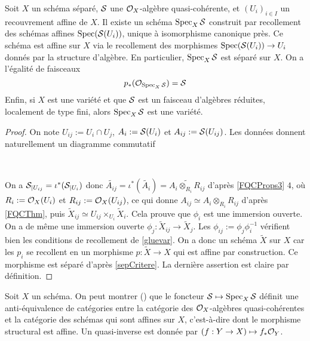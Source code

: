 \begin{cons}	\label{relspec}
Soit $X$ un schéma séparé, $\mathcal{S}$ une $\mathcal{O}_X$-algèbre quasi-cohérente, et $(U_i)_{i\in I}$ un recouvrement affine de $X$. Il existe un schéma $\operatorname{Spec}_X \mathcal{S}$ construit par recollement des schémas affines $\operatorname{Spec}(\mathcal{S}(U_i))$, unique à isomorphisme canonique près. Ce schéma est affine sur $X$ via le recollement des morphismes $\operatorname{Spec}(\mathcal{S}(U_i))\rightarrow U_i$ donnés par la structure d'algèbre. En particulier, $\operatorname{Spec}_X \mathcal{S}$ est séparé sur $X$. On a l'égalité de faisceaux
$$p_*(\mathcal{O}_{\operatorname{Spec}_X\mathcal{S}})=\mathcal{S}$$
Enfin, si $X$ est une variété et que $\mathcal{S}$ est un faisceau d'algèbres réduites, localement de type fini, alors $\operatorname{Spec}_X \mathcal{S}$ est une variété.
\end{cons}
\begin{proof}
On note $U_{ij}:=U_i\cap U_j$, $A_i:=\mathcal{S}(U_i)$ et $A_{ij}:=\mathcal{S}(U_{ij})$. Les données donnent naturellement un diagramme commutatif

	\begin{center}
	\\
	\end{center}
	
On a $\mathcal{S}_{|U_{ij}}=\iota^*(\mathcal{S}_{|U_i})$ donc $\widetilde{A_{ij}}=\iota^*(\widetilde{A_i})=\widetilde{A_i \otimes_{R_i}R_{ij}}$ d'après \ref{FQCProps3} $4$, où $R_i:=\mathcal{O}_X(U_i)$ et $R_{ij}:=\mathcal{O}_X(U_{ij})$, ce qui donne $A_{ij}\simeq A_i\otimes_{R_i}R_{ij}$ d'après \ref{FQCThm}, puis $\widetilde{X}_{ij}\simeq U_{ij}\times_{U_i}\widetilde{X}_i$. Cela prouve que $\phi_i$ est une immersion ouverte. On a de même une immersion ouverte $\phi_j:\widetilde{X}_{ij}\rightarrow \widetilde{X}_j$. Les $\phi_{ij}:=\phi_j\phi_i^{-1}$ vérifient bien les conditions de recollement de \ref{gluevar}. On a donc un schéma $\widetilde{X}$ sur $X$ car les $p_i$ se recollent en un morphisme $p:\widetilde{X}\rightarrow X$ qui est affine par construction. Ce morphisme est séparé d'après \ref{sepCritere}. La dernière assertion est claire par définition.
\end{proof}

\begin{rem}
Soit $X$ un schéma. On peut montrer (\cite[12.1]{Gortz}) que le foncteur $\mathcal{S}\mapsto \operatorname{Spec}_X\mathcal{S}$ définit une anti-équivalence de catégories entre la catégorie des $\mathcal{O}_X$-algèbres quasi-cohérentes et la catégorie des schémas qui sont affines sur $X$, c'est-à-dire dont le morphisme structural est affine. Un quasi-inverse est donnée par $(f:Y\rightarrow X)\mapsto f_*\mathcal{O}_Y$.
\end{rem}


